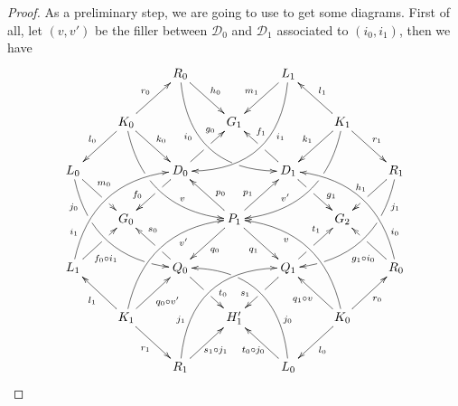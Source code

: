 \documentclass[a4paper,UKenglish,cleveref,pdftex, thm-restate,numberwithinsect]{lipics}
\newcommand{\dder}[1]{\mathscr{#1}}
\begin{document}
\begin{proof}  As a preliminary step, we are going to use  to get some diagrams.  First of all, let $(v,v')$ be the filler between $\dder{D}_0$ and $\dder{D}_1$ associated to $(i_0, i_1)$, then we have
	\[\xymatrix{&&R_0 \ar@/_1cm/[ddrr]_(.35){i_0}|(.7)\hole \ar[dr]^{h_0}&& L_1\ar@/^1cm/[ddll]^(.35){i_1}  \ar[dl]_{m_1}\\&K_0\ar[dr]^{k_0}\ar[dl]_{l_0} \ar@/_.8cm/[ddrr]|(.36)\hole^(.65){v}\ar[ur]^{r_0}&& G_1 && K_1 \ar@/^.8cm/[ddll]|(.36)\hole_(.65){v'}\ar[dl]_{k_1}\ar[lu]_{l_1} \ar[dr]^{r_1}\\L_0 \ar@/_.8cm/[ddrr]_(.2){j_0}|(.31)\hole|(.81)\hole \ar[dr]^(.4){m_0}|(.61)\hole && D_0 \ar[dl]|(.4)\hole_(.65){f_0}\ar[ur]|(.5)\hole^(.7){g_0}&&D_1 \ar[dr]|(.4)\hole^(.65){g_1} \ar[ul]|(.5)\hole_(.65){f_1}&&R_1\ar@/^.8cm/[ddll]^(.2){j_1}|(.31)\hole|(.81)\hole\ar[dl]_{h_1}|(.6)\hole\\&G_0 &&P_1\ar[dr]_{q_1} \ar[dl]^{q_0}\ar[ur]^(.4){p_1}\ar[ul]_(.4){p_0}&&G_2\\L_1 \ar@/^.8cm/[uurr]^(.2){i_1} \ar[ur]_(.35){f_0\circ i_1}|(.61)\hole&&Q_0 \ar[ul]|(.4)\hole_(.65){s_0}\ar[dr]|(.5)\hole^(.65){t_0} &&Q_1\ar[ur]|(.4)\hole^(.65){t_1} \ar[dl]|(.5)\hole_(.65){s_1} && R_0  \ar[ul]^(.35){g_1\circ i_0}|(.61)\hole\ar@/_.8cm/[uull]_(.2){i_0}\\&K_1 \ar[ur]_{q_0\circ v'} \ar[dr]_{r_1} \ar[ul]^{l_1}\ar@/^.8cm/[uurr]_(.65){v'}&&H'_1&& K_0 \ar[ur]_{r_0} \ar[ul]^{q_1\circ v} \ar[dl]^{l_0} \ar@/_.8cm/[uull]^(.65){v}\\&& R_1 \ar[ur]_{\hspace{-5pt}s_1\circ j_1}\ar@/^1cm/[uurr]^(.25){j_1}&& L_0 \ar[ul]^{t_0\circ j_0\hspace{-5pt}} \ar@/_1cm/[uull]_(.25){j_0} |(.69)\hole }\]
	

\end{proof}
\end{document}
